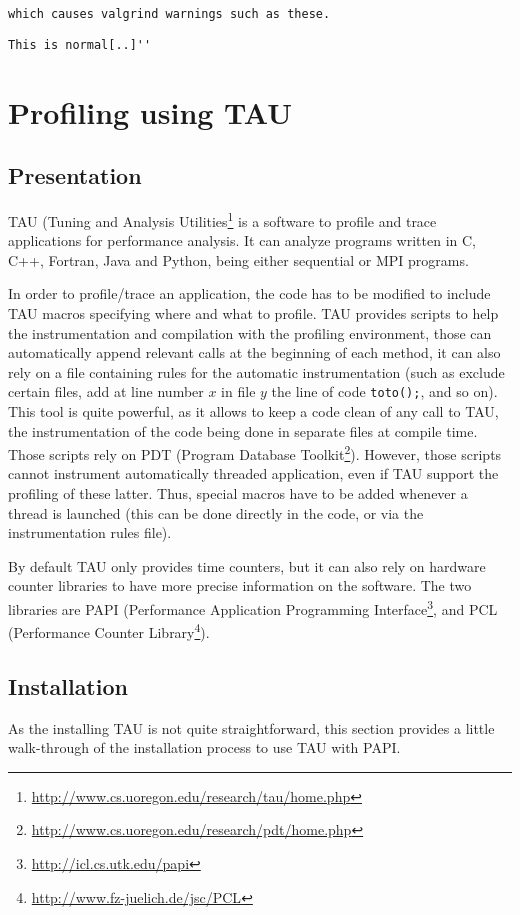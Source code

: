 \verb!which causes valgrind warnings such as these.!

\verb!This is normal[..]''!




\section{Profiling \diet using TAU}

\subsection{Presentation}

TAU (Tuning and Analysis
Utilities\footnote{\url{http://www.cs.uoregon.edu/research/tau/home.php}}
is a software to profile and trace applications for performance
analysis. It can analyze programs written in C, C++, Fortran, Java and
Python, being either sequential or MPI programs.

In order to profile/trace an application, the code has to be modified
to include TAU macros specifying where and what to profile. TAU
provides scripts to help the instrumentation and compilation with the
profiling environment, those can automatically append relevant calls
at the beginning of each method, it can also rely on a file containing
rules for the automatic instrumentation (such as exclude certain
files, add at line number $x$ in file $y$ the line of code
\texttt{toto();}, and so on). This tool is quite powerful, as it
allows to keep a code clean of any call to TAU, the instrumentation of
the code being done in separate files at compile time. Those scripts
rely on PDT (Program Database
Toolkit\footnote{\url{http://www.cs.uoregon.edu/research/pdt/home.php}}). However,
those scripts cannot instrument automatically threaded application,
even if TAU support the profiling of these latter. Thus, special
macros have to be added whenever a thread is launched (this can be
done directly in the code, or via the instrumentation rules file).

By default TAU only provides time counters, but it can also rely on
hardware counter libraries to have more precise information on the
software. The two libraries are PAPI (Performance Application
Programming Interface\footnote{\url{http://icl.cs.utk.edu/papi}}, and
PCL (Performance Counter Library\footnote{\url{http://www.fz-juelich.de/jsc/PCL}}).


\subsection{Installation}
As the installing TAU is not quite straightforward, this section
provides a little walk-through of the installation process to use TAU
with PAPI.

